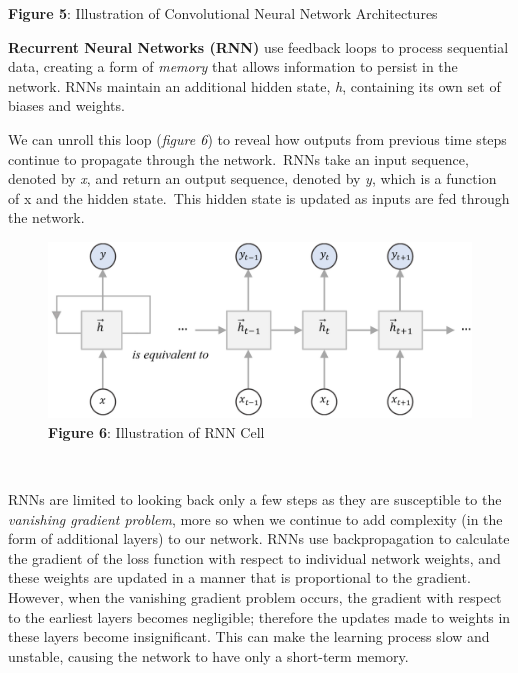\documentclass[12pt,a4paper]{article}
\begin{document}
\begin{center}
	\textbf{Figure 5}: Illustration of Convolutional Neural Network Architectures\\
\end{center}


\noindent \textbf{Recurrent Neural Networks (RNN)} use feedback loops to process sequential data, creating a form of \textit{memory} that allows information to persist in the network. RNNs maintain an additional hidden state, \textit{h}, containing its own set of biases and weights.\vspace{5pt}

\hspace{-20pt}\begin{minipage}{0.6\textwidth}	
	 We can unroll this loop (\textit{figure 6}) to reveal how outputs from previous time steps continue to propagate through the network.\ RNNs take an input sequence, denoted by \textit{x}, and return an output sequence, denoted by \textit{y}, which is a function of x and the hidden state.\ This hidden state is updated as inputs are fed through the network.\\
\end{minipage}
\hspace{10pt}
\begin{minipage}{0.4\textwidth}
	\vspace{-40pt}
	\begin{figure}[H]
		\includegraphics[width=1\textwidth]{Images/RNN_diagram1.png}\\
		\centering\textbf{Figure 6}: Illustration of RNN Cell
	\end{figure}
\end{minipage}\\\vspace{-10pt}

\noindent RNNs are limited to looking back only a few steps as they are susceptible to the \textit{vanishing gradient problem}, more so when we continue to add complexity (in the form of additional layers) to our network. RNNs use backpropagation to calculate the gradient of the loss function with respect to individual network weights, and these weights are updated in a manner that is proportional to the gradient. However, when the vanishing gradient problem occurs, the gradient with respect to the earliest layers becomes negligible; therefore the updates made to weights in these layers become insignificant. This can make the learning process slow and unstable, causing the network to have only a short-term memory.
\end{document}

